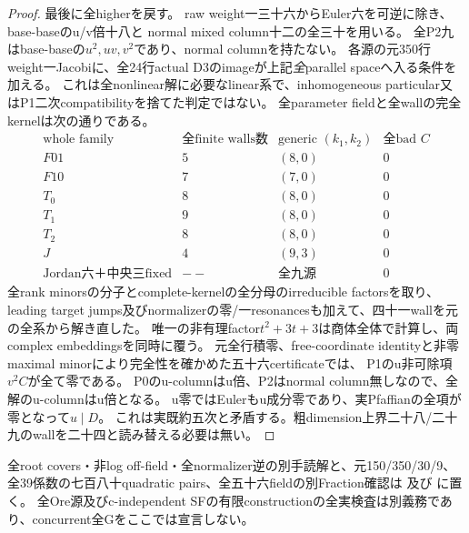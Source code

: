 \documentclass[a4paper,11pt]{ltjsarticle}
\theoremstyle{definition}
\begin{document}
\begin{proof}
最後に全higherを戻す。
raw weight一三十六からEuler六を可逆に除き、base-baseのu/v倍十八と
normal mixed column十二の全三十を用いる。
全P2九はbase-baseの$u^2,uv,v^2$であり、normal columnを持たない。
各源の元350行weight一Jacobiに、全24行actual D3のimageが上記\emph{全}parallel spaceへ入る条件を加える。
これは全nonlinear解に必要なlinear系で、inhomogeneous particular又はP1二次compatibilityを捨てた判定ではない。
全parameter fieldと全wallの完全kernelは次の通りである。
\[
\begin{array}{c|c|c|c}
 \text{whole family}&\text{全finite walls数}&\text{generic }(k_1,k_2)&\text{全bad }C\\\hline
 F01&5&(8,0)&0\\
 F10&7&(7,0)&0\\
 T_0&8&(8,0)&0\\
 T_1&9&(8,0)&0\\
 T_2&8&(8,0)&0\\
 J&4&(9,3)&0\\
 \text{Jordan六＋中央三fixed}&--&\text{全九源}&0
\end{array}
\]
全rank minorsの分子とcomplete-kernelの全分母のirreducible factorsを取り、
leading target jumps及びnormalizerの零/一resonancesも加えて、四十一wallを元の全系から解き直した。
唯一の非有理factor$t^2+3t+3$は商体全体で計算し、両complex embeddingsを同時に覆う。
元全行積零、free-coordinate identityと非零maximal minorにより完全性を確かめた五十六certificateでは、
P1のu非可除項$v^2C$が全て零である。
P0のu-columnはu倍、P2はnormal column無しなので、全解のu-columnはu倍となる。
u零ではEulerもu成分零であり、実Pfaffianの全項が零となって$u\mid D$。
これは実既約五次と矛盾する。粗dimension上界二十八/二十九のwallを二十四と読み替える必要は無い。
\end{proof}
全root covers・非log off-field・全normalizer逆の別手読解と、元150/350/30/9、
全39係数の七百八十quadratic pairs、全五十六fieldの別Fraction確認は
及び
に置く。
全Ore源及びc-independent SFの有限constructionの全実検査は別義務であり、concurrent全Gをここでは宣言しない。
\end{document}
